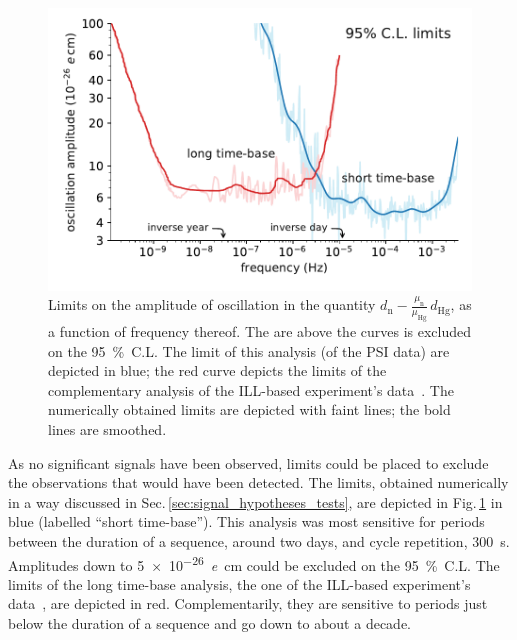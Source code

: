 \begin{figure}
  \centering
  \includegraphics[width=\linewidth]{gfx/axions/psi_ill_1e-26ecm.pdf}
  \caption{Limits on the amplitude of oscillation in the quantity $d_\text{n} - \frac{\mu_\text{n}}{\mu_\text{Hg}} \, d_\text{Hg}$, as a function of frequency thereof. The are above the curves is excluded on the \SI{95}{\percent}~C.L.
  The limit of this analysis (of the PSI data) are depicted in blue; the red curve depicts the limits of the complementary analysis of the ILL-based experiment's data~\cite{AyresThesis,PhysRevX.7.041034}.
  The numerically obtained limits are depicted with faint lines; the bold lines are smoothed.}
\label{fig:axions_limits_nEDM}
\end{figure}

As no significant signals have been observed, limits could be placed to exclude the observations that would have been detected.
The limits, obtained numerically in a way discussed in Sec.\,\ref{sec:signal_hypotheses_tests}, are depicted in Fig.\,\ref{fig:axions_limits_nEDM} in blue (labelled ``short time-base'').
This analysis was most sensitive for periods between the duration of a sequence, around two days, and cycle repetition, \SI{300}{\second}.
Amplitudes down to \SI{5e-26}{\elementarycharge\centi\meter} could be excluded on the \SI{95}{\percent}~C.L.
The limits of the long time-base analysis, the one of the ILL-based experiment's data~\cite{AyresThesis,PhysRevX.7.041034}, are depicted in red.
Complementarily, they are sensitive to periods just below the duration of a sequence and go down to about a decade.

